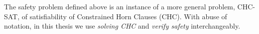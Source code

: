 The safety problem defined above is an instance of a more general problem,
CHC-SAT, of satisfiability of Constrained Horn Clauses (CHC). With abuse of notation, in this thesis we use \textit{solving CHC} and \textit{verify safety} interchangeably.





